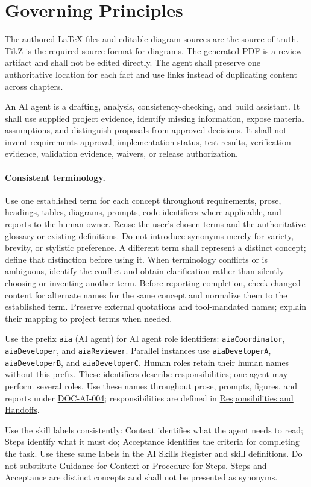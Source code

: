 \section{Governing Principles}
The authored LaTeX files and editable diagram sources are the source of truth.
TikZ is the required source format for diagrams.
The generated PDF is a review artifact and shall not be edited directly. The
agent shall preserve one authoritative location for each fact and use links
instead of duplicating content across chapters.

An AI agent is a drafting, analysis, consistency-checking, and build assistant.
It shall use supplied project evidence, identify missing information, expose
material assumptions, and distinguish proposals from approved decisions. It
shall not invent requirements approval, implementation status, test results,
verification evidence, validation evidence, waivers, or release authorization.

\paragraph{Consistent terminology.}\label{Rule:AITerminologyConsistency}
Use one established term for each concept throughout requirements, prose,
headings, tables, diagrams, prompts, code identifiers where applicable, and
reports to the human owner. Reuse the user's chosen terms and the authoritative
glossary or existing definitions. Do not introduce synonyms merely for variety,
brevity, or stylistic preference. A different term shall represent a distinct
concept; define that distinction before using it. When terminology conflicts or
is ambiguous, identify the conflict and obtain clarification rather than
silently choosing or inventing another term. Before reporting completion,
check changed content for alternate names for the same concept and normalize
them to the established term. Preserve external quotations and tool-mandated
names; explain their mapping to project terms when needed.

\begingroup\setlength{\emergencystretch}{2em}
Use the prefix \texttt{aia} (AI agent) for AI agent role identifiers:
\texttt{aiaCoordinator}, \texttt{aiaDeveloper}, and \texttt{aiaReviewer}.
Parallel instances use \texttt{aiaDeveloperA}, \texttt{aiaDeveloperB}, and
\texttt{aiaDeveloperC}. Human roles retain their human names without this
prefix. These identifiers describe responsibilities; one agent may perform
several roles. Use these names throughout prose, prompts, figures, and reports
under \hyperref[Requirement:DOCAI004]{DOC-AI-004}; responsibilities are defined
in \hyperref[Section:AIAgentRoles]{Responsibilities and Handoffs}.\par\endgroup
Use the skill labels consistently: Context identifies what the agent needs
to read; Steps identify what it must do; Acceptance identifies the criteria
for completing the task. Use these same labels in the AI Skills Register and skill
definitions. Do not substitute Guidance for Context or Procedure for Steps.
Steps and Acceptance are distinct concepts and shall not be presented as
synonyms.

